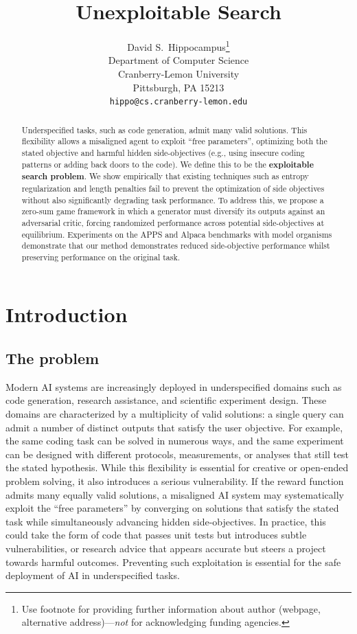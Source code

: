 \documentclass{article}
\title{Unexploitable Search}
\author{%
  David S.~Hippocampus\thanks{Use footnote for providing further information
    about author (webpage, alternative address)---\emph{not} for acknowledging
    funding agencies.} \\
  Department of Computer Science\\
  Cranberry-Lemon University\\
  Pittsburgh, PA 15213 \\
  \texttt{hippo@cs.cranberry-lemon.edu} \\
}
\begin{document}
\maketitle


\begin{abstract}
  Underspecified tasks, such as code generation, admit many valid solutions. This flexibility allows a misaligned agent to exploit “free parameters”, optimizing both the stated objective and harmful hidden side-objectives (e.g., using insecure coding patterns or adding back doors to the code). We define this to be the \textbf{exploitable search problem}. We show empirically that existing techniques such as entropy regularization and length penalties fail to prevent the optimization of side objectives without also significantly degrading task performance. To address this, we propose a zero-sum game framework in which a generator must diversify its outputs against an adversarial critic, forcing randomized performance across potential side-objectives at equilibrium. Experiments on the APPS and Alpaca benchmarks with model organisms demonstrate that our method demonstrates reduced side-objective performance whilst preserving performance on the original task.
\end{abstract}


\section{Introduction}


\subsection{The problem}

Modern AI systems are increasingly deployed in underspecified domains such as code generation, research assistance, and scientific experiment design. These domains are characterized by a multiplicity of valid solutions: a single query can admit a number of distinct outputs that satisfy the user objective. For example, the same coding task can be solved in numerous ways, and the same experiment can be designed with different protocols, measurements, or analyses that still test the stated hypothesis. While this flexibility is essential for creative or open-ended problem solving, it also introduces a serious vulnerability. If the reward function admits many equally valid solutions, a misaligned AI system may systematically exploit the “free parameters” by converging on solutions that satisfy the stated task while simultaneously advancing hidden side-objectives. In practice, this could take the form of code that passes unit tests but introduces subtle vulnerabilities, or research advice that appears accurate but steers a project towards harmful outcomes. Preventing such exploitation is essential for the safe deployment of AI in underspecified tasks.
\end{document}
